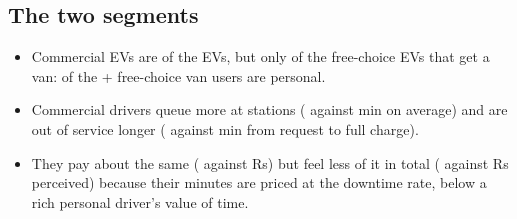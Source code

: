 
\subsection{The two segments}
\begin{table}[H]
\centering\scriptsize
\caption{The two segments over all EVs of the \NValid{} valid plans (van share over free-choice EVs; queue over station users; van wait over van users).}
\label{tab:segments}

\resizebox{\textwidth}{!}{}
\end{table}
\begin{itemize}
  \item Commercial EVs are \CommShareAll\pct{} of the \NEVsValid{} EVs, but only \CommShareOfFreeVan\pct{} of the free-choice EVs that get a van: \NFreeVanPersonal{} of the \NFreeVanPersonal{}+\NFreeVanCommercial{} free-choice van users are personal.
  \item Commercial drivers queue more at stations (\QueueCommercial{} against \QueuePersonal{} min on average) and are out of service longer (\DowntimeCommercial{} against \DowntimePersonal{} min from request to full charge).
  \item They pay about the same (\PayCommercial{} against \PayPersonal{} Rs) but feel less of it in total (\PercCommercial{} against \PercPersonal{} Rs perceived) because their minutes are priced at the downtime rate, below a rich personal driver's value of time.
\end{itemize}


